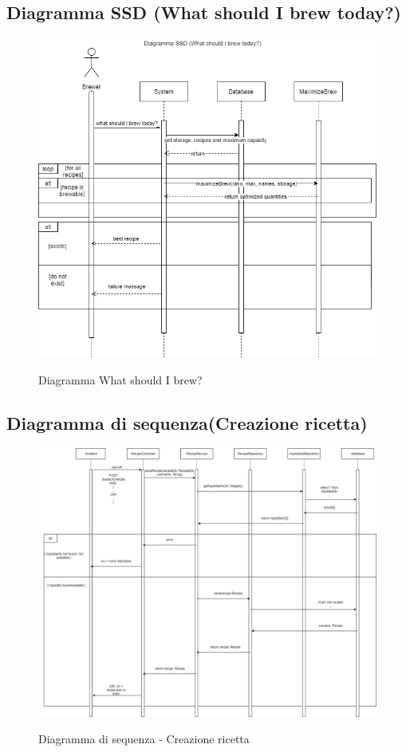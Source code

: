 \documentclass{article}
\begin{document}
\subsection{Diagramma SSD (What should I brew today?)}
\begin{figure}[h!]
\centering
\includegraphics[scale=0.5]{Diagramma SSD (1).png}
\label{fig:Diagramma What should I brew?}
\caption{Diagramma What should I brew?}
\end{figure}
\clearpage
\subsection{Diagramma di sequenza(Creazione ricetta)}
\begin{figure}[h!]
\centering
\includegraphics[scale=0.35]{Diagramma di Sequenza (1).png}
\label{fig:Diagramma di sequenza - Creazione ricetta}
\caption{Diagramma di sequenza - Creazione ricetta}
\end{figure}
\clearpage
\end{document}
